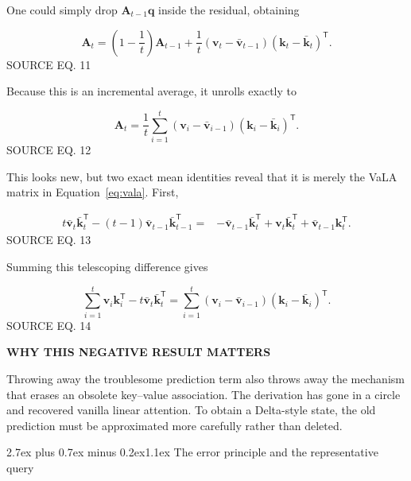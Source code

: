 \documentclass[11pt]{article}
\makeatletter
\newcommand{\vect}[1]{\bm{#1}}
\newcommand{\trans}{^{\mathsf T}}
\newcommand{\sourceeq}[1]{\hfill{\sffamily\scriptsize\color{Muted}SOURCE EQ. #1}}
\newenvironment{graybox}[1]{%
  \def\FrameCommand{\fcolorbox{RuleGray}{PaperGray}}%
  \MakeFramed{\advance\hsize-\width\FrameRestore}%
  {\sffamily\bfseries\color{Ink}#1}\par\smallskip
}{\endMakeFramed}
\renewcommand\section{\@startsection{section}{1}{0pt}%
  {2.7ex plus 0.7ex minus 0.2ex}{1.1ex}%
  {\normalfont\sffamily\Large\bfseries\color{Ink}}}
\makeatother
\begin{document}
One could simply drop $\vect A_{t-1}\vect q$ inside the residual, obtaining

\begin{equation}
  \vect A_t=\left(1-\frac1t\right)\vect A_{t-1}
  +\frac1t(\vect v_t-\bar{\vect v}_{t-1})
  (\vect k_t-\bar{\vect k}_t)\trans.
  \tag{11}\label{eq:drop}
\end{equation}
\sourceeq{11}

Because this is an incremental average, it unrolls exactly to

\begin{equation}
  \vect A_t=\frac1t\sum_{i=1}^{t}
  (\vect v_i-\bar{\vect v}_{i-1})
  (\vect k_i-\bar{\vect k}_i)\trans.
  \tag{12}\label{eq:unroll}
\end{equation}
\sourceeq{12}

This looks new, but two exact mean identities reveal that it is merely the
VaLA matrix in Equation~\eqref{eq:vala}. First,

\begin{align}
  t\bar{\vect v}_t\bar{\vect k}_t\trans
  -(t-1)\bar{\vect v}_{t-1}\bar{\vect k}_{t-1}\trans
  ={}&-\bar{\vect v}_{t-1}\bar{\vect k}_t\trans
  +\vect v_t\bar{\vect k}_t\trans
  +\bar{\vect v}_{t-1}\vect k_t\trans.
  \tag{13}\label{eq:meanidentity}
\end{align}
\sourceeq{13}

Summing this telescoping difference gives

\begin{equation}
  \sum_{i=1}^{t}\vect v_i\vect k_i\trans
  -t\bar{\vect v}_t\bar{\vect k}_t\trans
  =\sum_{i=1}^{t}
  (\vect v_i-\bar{\vect v}_{i-1})
  (\vect k_i-\bar{\vect k}_i)\trans.
  \tag{14}\label{eq:telescoping}
\end{equation}
\sourceeq{14}

\begin{graybox}{WHY THIS NEGATIVE RESULT MATTERS}
  Throwing away the troublesome prediction term also throws away the mechanism
  that erases an obsolete key--value association. The derivation has gone in a
  circle and recovered vanilla linear attention. To obtain a Delta-style state,
  the old prediction must be approximated more carefully rather than deleted.
\end{graybox}

\section{The error principle and the representative query}
\end{document}
